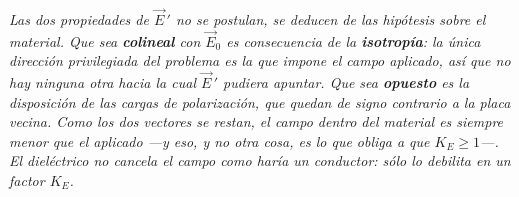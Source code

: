 \begin{center}
\\[0.5em]
{\small\itshape Las dos propiedades de $\vec E\,'$ no se postulan, se deducen de
las hipótesis sobre el material. Que sea \textbf{colineal} con $\vec E_0$ es
consecuencia de la \textbf{isotropía}: la única dirección privilegiada del
problema es la que impone el campo aplicado, así que no hay ninguna otra hacia
la cual $\vec E\,'$ pudiera apuntar. Que sea \textbf{opuesto} es la disposición
de las cargas de polarización, que quedan de signo contrario a la placa vecina.
Como los dos vectores se restan, el campo dentro del material es siempre
\emph{menor} que el aplicado ---y eso, y no otra cosa, es lo que obliga a que
$K_E \geq 1$---. El dieléctrico no cancela el campo como haría un conductor:
sólo lo debilita en un factor $K_E$.}
\end{center}
